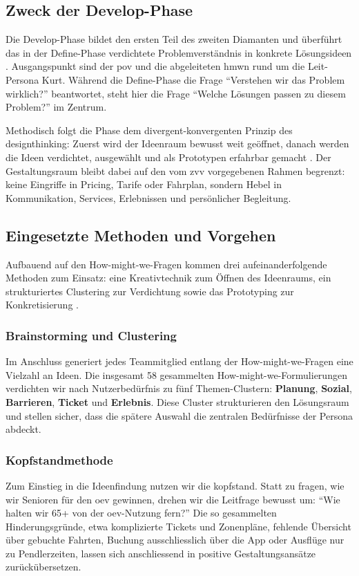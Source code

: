 \subsection{Zweck der Develop-Phase}

Die Develop-Phase bildet den ersten Teil des zweiten Diamanten und überführt das in der Define-Phase verdichtete Problemverständnis in konkrete Lösungsideen \parencite{designcouncil2005}. Ausgangspunkt sind der \gls{pov} und die abgeleiteten \gls{hmw}n rund um die Leit-Persona Kurt. Während die Define-Phase die Frage \enquote{Verstehen wir das Problem wirklich?} beantwortet, steht hier die Frage \enquote{Welche Lösungen passen zu diesem Problem?} im Zentrum.

Methodisch folgt die Phase dem divergent-konvergenten Prinzip des \gls{designthinking}: Zuerst wird der Ideenraum bewusst weit geöffnet, danach werden die Ideen verdichtet, ausgewählt und als Prototypen erfahrbar gemacht \parencite{lewrick2018}. Der Gestaltungsraum bleibt dabei auf den vom \gls{zvv} vorgegebenen Rahmen begrenzt: keine Eingriffe in Pricing, Tarife oder Fahrplan, sondern Hebel in Kommunikation, Services, Erlebnissen und persönlicher Begleitung.

\subsection{Eingesetzte Methoden und Vorgehen}

Aufbauend auf den How-might-we-Fragen kommen drei aufeinanderfolgende Methoden zum Einsatz: eine Kreativtechnik zum Öffnen des Ideenraums, ein strukturiertes Clustering zur Verdichtung sowie das Prototyping zur Konkretisierung \parencite{casaisd2026ideation}.

\subsubsection{Brainstorming und Clustering}
Im Anschluss generiert jedes Teammitglied entlang der How-might-we-Fragen eine Vielzahl an Ideen. Die insgesamt 58 gesammelten How-might-we-Formulierungen verdichten wir nach Nutzerbedürfnis zu fünf Themen-Clustern: \textbf{Planung}, \textbf{Sozial}, \textbf{Barrieren}, \textbf{Ticket} und \textbf{Erlebnis}. Diese Cluster strukturieren den Lösungsraum und stellen sicher, dass die spätere Auswahl die zentralen Bedürfnisse der Persona abdeckt.

\subsubsection{Kopfstandmethode}
Zum Einstieg in die Ideenfindung nutzen wir die \gls{kopfstand}. Statt zu fragen, wie wir Senioren für den \gls{oev} gewinnen, drehen wir die Leitfrage bewusst um: \enquote{Wie halten wir 65+ von der \gls{oev}-Nutzung fern?} Die so gesammelten Hinderungsgründe, etwa komplizierte Tickets und Zonenpläne, fehlende Übersicht über gebuchte Fahrten, Buchung ausschliesslich über die App oder Ausflüge nur zu Pendlerzeiten, lassen sich anschliessend in positive Gestaltungsansätze zurückübersetzen.

